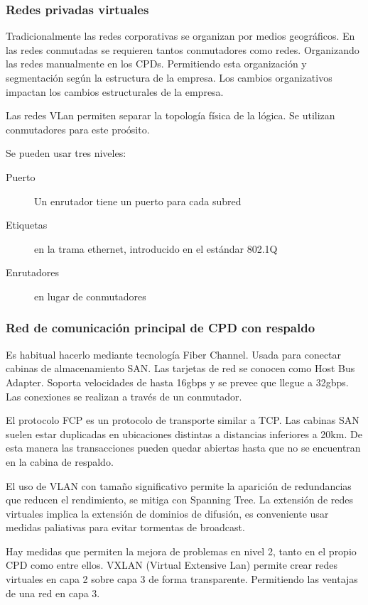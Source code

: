     \subsubsection{Redes privadas virtuales} %
        Tradicionalmente las redes corporativas se organizan por medios geográficos. En las redes conmutadas se requieren tantos conmutadores como redes. Organizando las redes manualmente en los CPDs. Permitiendo esta organización y segmentación según la estructura de la empresa. Los cambios organizativos impactan los cambios estructurales de la empresa.

        Las redes VLan permiten separar la topología física de la lógica. Se utilizan conmutadores para este proósito. 
        
        Se pueden usar tres niveles:
        \begin{description}
            \item[Puerto] Un enrutador tiene un puerto para cada subred
            \item[Etiquetas] en la trama ethernet, introducido en el estándar 802.1Q
            \item[Enrutadores] en lugar de conmutadores
        \end{description}

    \subsubsection{Red de comunicación principal de CPD con respaldo} %
        Es habitual hacerlo mediante tecnología Fiber Channel. Usada para conectar cabinas de almacenamiento SAN. Las tarjetas de red se conocen como Host Bus Adapter. Soporta velocidades de hasta 16gbps y se prevee que llegue a 32gbps. Las conexiones se realizan a través de un conmutador.

        El protocolo FCP es un protocolo de transporte similar a TCP. Las cabinas SAN suelen estar duplicadas en ubicaciones distintas a distancias inferiores a 20km. De esta manera las transacciones pueden quedar abiertas hasta que no se encuentran en la cabina de respaldo. 

        El uso de VLAN con tamaño significativo permite la aparición de redundancias que reducen el rendimiento, se mitiga con Spanning Tree. La extensión de redes virtuales implica la extensión de dominios de difusión, es conveniente usar medidas paliativas para evitar tormentas de broadcast.

        Hay medidas que permiten la mejora de problemas en nivel 2, tanto en el propio CPD como entre ellos. VXLAN (Virtual Extensive Lan) permite crear redes virtuales en capa 2 sobre capa 3 de forma transparente. Permitiendo las ventajas de una red en capa 3.

